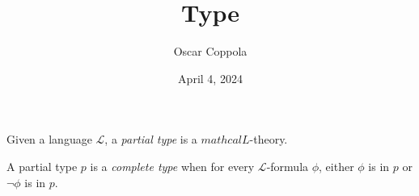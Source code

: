 \documentclass[a4paper]{article}
\title{Type}
\date{April 4, 2024}
\author{Oscar Coppola}
\begin{document}
\maketitle
\par{
    Given a language \(\mathcal  L\), a \emph{partial type} is a  \(mathcal L\)-theory.
}\par{
    A partial type \(p\) is a \emph{complete type} when for every \(\mathcal  L\)-formula \(\phi\), either \(\phi\) is in \(p\)
    or \(\neg \phi\) is in \(p\).
}
\printbibliography
\end{document}
